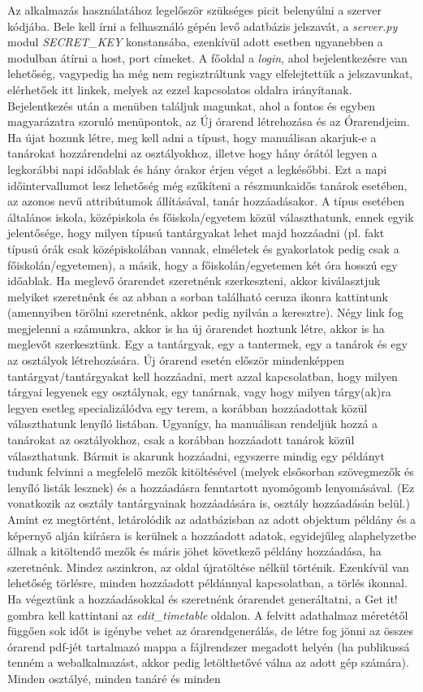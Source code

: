 Az alkalmazás használatához legelőször szükséges picit belenyúlni a szerver kódjába. Bele kell írni a felhasználó gépén levő adatbázis jelszavát, a \textit{server.py} modul \textit{SECRET\_KEY} konstansába, ezenkívül adott esetben ugyanebben a modulban átírni a host, port címeket. A főoldal a \textit{login}, ahol bejelentkezésre van lehetőség, vagypedig ha még nem regisztráltunk vagy elfelejtettük a jelszavunkat, elérhetőek itt linkek, melyek az ezzel kapcsolatos oldalra irányítanak. Bejelentkezés után a menüben találjuk magunkat, ahol a fontos és egyben magyarázatra szoruló menüpontok, az Új órarend létrehozása és az Órarendjeim. Ha újat hozunk létre, meg kell adni a típust, hogy manuálisan akarjuk-e a tanárokat hozzárendelni az osztályokhoz, illetve hogy hány órától legyen a legkorábbi napi időablak és hány órakor érjen véget a legkésőbbi. Ezt a napi időintervallumot lesz lehetőség még szűkíteni a részmunkaidős tanárok esetében, az azonos nevű attribútumok állításával, tanár hozzáadásakor. A típus esetében általános iskola, középiskola és főiskola/egyetem közül választhatunk, ennek egyik jelentősége, hogy milyen típusú tantárgyakat lehet majd hozzáadni (pl. fakt típusú órák csak középiskolában vannak, elméletek és gyakorlatok pedig csak a főiskolán/egyetemen), a másik, hogy a főiskolán/egyetemen két óra hosszú egy időablak. Ha meglevő órarendet szeretnénk szerkeszteni, akkor kiválasztjuk melyiket szeretnénk és az abban a sorban található ceruza ikonra kattintunk (amennyiben törölni szeretnénk, akkor pedig nyilván a keresztre). Négy link fog megjelenni a számunkra, akkor is ha új órarendet hoztunk létre, akkor is ha meglevőt szerkesztünk. Egy a tantárgyak, egy a tantermek, egy a tanárok és egy az osztályok létrehozására. Új órarend esetén először mindenképpen tantárgyat/tantárgyakat kell hozzáadni, mert azzal kapcsolatban, hogy milyen tárgyai legyenek egy osztálynak, egy tanárnak, vagy hogy milyen tárgy(ak)ra legyen esetleg specializálódva egy terem, a korábban hozzáadottak közül választhatunk lenyíló listában. Ugyanígy, ha manuálisan rendeljük hozzá a tanárokat az osztályokhoz, csak a korábban hozzáadott tanárok közül választhatunk. Bármit is akarunk hozzáadni, egyszerre mindig egy példányt tudunk felvinni a megfelelő mezők kitöltésével (melyek elsősorban szövegmezők és lenyíló listák lesznek) és a hozzáadásra fenntartott nyomógomb lenyomásával. (Ez vonatkozik az osztály tantárgyainak hozzáadására is, osztály hozzáadásán belül.) Amint ez megtörtént, letárolódik az adatbázisban az adott objektum példány és a képernyő alján kiírásra is kerülnek a hozzáadott adatok, egyidejűleg alaphelyzetbe állnak a kitöltendő mezők és máris jöhet következő példány hozzáadása, ha szeretnénk. Mindez aszinkron, az oldal újratöltése nélkül történik. Ezenkívül van lehetőség törlésre, minden hozzáadott példánnyal kapcsolatban, a törlés ikonnal. Ha végeztünk a hozzáadásokkal és szeretnénk órarendet generáltatni, a Get it! gombra kell kattintani az \textit{edit\_timetable} oldalon. A felvitt adathalmaz méretétől függően sok időt is igénybe vehet az órarendgenerálás, de létre fog jönni az összes órarend pdf-jét tartalmazó mappa a fájlrendszer megadott helyén (ha publikussá tenném a webalkalmazást, akkor pedig letölthetővé válna az adott gép számára). Minden osztályé, minden tanáré és minden 
